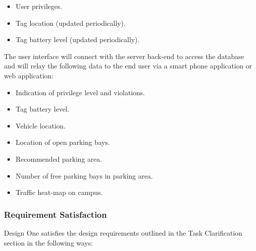 \begin{itemize}
\item User privileges.
\item Tag location (updated periodically).
\item Tag battery level (updated periodically).
\end{itemize}

The user interface will connect with the server back-end to access the database and will relay the following data to the end user via a smart phone application or web application: 
\begin{itemize}
\item Indication of privilege level and violations.
\item Tag battery level.
\item Vehicle location.
\item Location of open parking bays.
\item Recommended parking area.
\item Number of free parking bays in parking area.
\item Traffic heat-map on campus.
\end{itemize}

\subsubsection{Requirement Satisfaction\cite{assignment}}
Design One satisfies the design requirements outlined in the Task Clarification section in the following ways:

